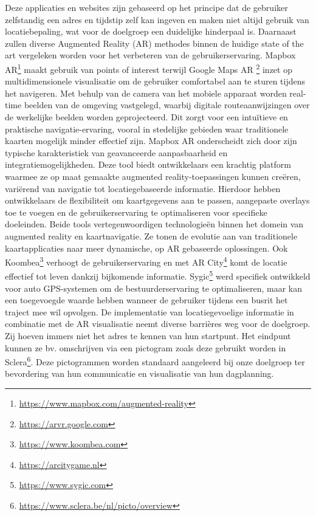   Deze applicaties en websites zijn gebaseerd op het principe dat de gebruiker zelfstandig een adres en tijdstip zelf kan ingeven en maken niet altijd gebruik van locatiebepaling, wat voor de doelgroep een duidelijke hinderpaal is.
  Daarnaast zullen diverse Augmented Reality (AR) methodes binnen de huidige state of the art vergeleken worden voor het verbeteren van de gebruikerservaring.
  Mapbox AR\footnote{\url{https://www.mapbox.com/augmented-reality}} maakt gebruik van points of interest terwijl Google Maps AR \footnote{\url{https://arvr.google.com}} inzet op multidimensionele visualisatie om de gebruiker comfortabel aan te sturen tijdens het navigeren.
  Met behulp van de camera van het mobiele apparaat worden real-time beelden van de omgeving vastgelegd, waarbij digitale routeaanwijzingen over de werkelijke beelden worden geprojecteerd.
  Dit zorgt voor een intuïtieve en praktische navigatie-ervaring, vooral in stedelijke gebieden waar traditionele kaarten mogelijk minder effectief zijn.
  Mapbox AR onderscheidt zich door zijn typische karakteristiek van geavanceerde aanpasbaarheid en integratiemogelijkheden.
  Deze tool biedt ontwikkelaars een krachtig platform waarmee ze op maat gemaakte augmented reality-toepassingen kunnen creëren, variërend van navigatie tot locatiegebaseerde informatie.
  Hierdoor hebben ontwikkelaars de flexibiliteit om kaartgegevens aan te passen, aangepaste overlays toe te voegen en de gebruikerservaring te optimaliseren voor specifieke doeleinden.
  Beide tools vertegenwoordigen technologieën binnen het domein van augmented reality en kaartnavigatie. Ze tonen de evolutie aan van traditionele kaartapplicaties naar meer dynamische, op AR gebaseerde oplossingen.
  Ook Koombea\footnote{\url{https://www.koombea.com}} verhoogt de gebruikerservaring en met AR City\footnote{\url{https://arcitygame.nl}} komt de locatie effectief tot leven dankzij bijkomende informatie.
  Sygic\footnote{\url{https://www.sygic.com}} werd specifiek ontwikkeld voor auto GPS-systemen om de bestuurderservaring te optimaliseren, maar kan een toegevoegde waarde hebben wanneer de gebruiker tijdens een busrit het traject mee wil opvolgen.
  De implementatie van locatiegevoelige informatie in combinatie met de AR visualisatie neemt diverse barrières weg voor de doelgroep.
  Zij hoeven immers niet het adres te kennen van hun startpunt. Het eindpunt kunnen ze bv. omschrijven via een pictogram zoals deze gebruikt worden in Sclera\footnote{\url{https://www.sclera.be/nl/picto/overview}}.
  Deze pictogrammen worden standaard aangeleerd bij onze doelgroep ter bevordering van hun communicatie en visualisatie van hun dagplanning.
